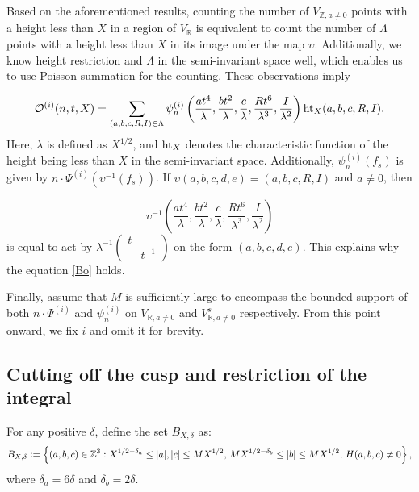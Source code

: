 \documentclass{article}
\def\R{{\mathbb R}}
\def \h{{\rm ht}}
\def \Bo{{\mathcal{O}^{(i)}(n,t,X)}}
\begin{document}
Based on the aforementioned results, counting the number of $V_{\mathbb{Z},a\neq 0}$ points with a height less than $X$ in a region of $V_{\mathbb{R}}$ is equivalent to count the number of $\Lambda$ points with a height less than $X$ in its image under the map $\upsilon$. Additionally, we know height restriction and $\Lambda$ in the semi-invariant space well, which enables us to use Poisson summation for the counting. 
These observations imply

\begin{equation}\label{Bo}
\Bo = \sum_{(a,b,c,R,I) \in \Lambda} \psi^{(i)}_{n}\left(\frac{at^4}{\lambda},\frac{bt^2}{\lambda},\frac{c}{\lambda},\frac{Rt^6}{\lambda^3},\frac{I}{\lambda^2}\right) \h_X(a,b,c,R,I).
\end{equation}
Here, $\lambda$ is defined as $X^{1/2}$, and $\h_X$ denotes the characteristic function of the height being less than $X$ in the semi-invariant space. Additionally, $\psi^{(i)}_{n}(f_s)$ is given by $n \cdot \Psi^{(i)}(\upsilon^{-1}(f_s))$. If $\upsilon(a,b,c,d,e) = (a,b,c,R,I)$ and $a\neq0$, then

\begin{equation*}
\upsilon^{-1}\left(\frac{at^4}{\lambda}, \frac{bt^2}{\lambda}, \frac{c}{\lambda}, \frac{Rt^6}{\lambda^3}, \frac{I}{\lambda^2}\right)
\end{equation*}
is equal to act by  $\lambda^{-1} \begin{pmatrix} t & \\ & t^{-1} \end{pmatrix}$ on the form $(a,b,c,d,e)$. This explains why the equation \eqref{Bo} holds.

Finally, assume that $M$ is sufficiently large to encompass the bounded support of both $n \cdot \Psi^{(i)}$ and $\psi^{(i)}_{n}$ on $V_{\R, a \neq 0}$ and $V_{\R, a \neq 0}^s$ respectively. From this point onward, we fix $i$ and omit it for brevity.


\subsection{Cutting off the cusp and restriction of the integral}
For any positive $\delta$, define the set $B_{X,\delta}$ as:
\begin{equation*}
B_{X, \delta} \vcentcolon= \left\{ (a, b, c) \in \mathbb{Z}^3 : X^{1/2 - \delta_a} \leq |a|, |c| \leq MX^{1/2}, \, MX^{1/2 - \delta_b} \leq |b| \leq MX^{1/2}, \,H(a, b, c) \neq 0 \right\}, \end{equation*} where $\delta_a = 6\delta$ and $\delta_b = 2\delta$.
\end{document}

